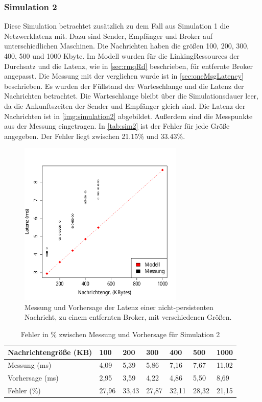 \subsubsection{Simulation 2} 
Diese Simulation betrachtet zusätzlich zu dem Fall aus Simulation 1 die Netzwerklatenz mit. Dazu sind Sender, Empfänger und Broker auf unterschiedlichen Maschinen. Die Nachrichten haben die größen 100, 200, 300, 400, 500 und 1000 Kbyte. Im Modell wurden für die LinkingRessources der Durchsatz und die Latenz, wie in \autoref{sec:rmqRd} beschrieben, für entfernte Broker angepasst. Die Messung mit der verglichen wurde ist in \autoref{sec:oneMsgLatency} beschrieben. Es wurden der Füllstand der Warteschlange und die Latenz der Nachrichten betrachtet. 
Die Warteschlange bleibt über die Simulationsdauer leer, da die Ankunftszeiten der Sender und Empfänger gleich sind. Die Latenz der Nachrichten ist in \autoref{img:simulation2} abgebildet. Außerdem sind die Messpunkte aus der Messung eingetragen. In \autoref{tab:sim2} ist der Fehler für jede Größe angegeben. Der Fehler liegt zwischen 21.15\% und 33.43\%.
\begin{figure}
\center
  \includegraphics[width=0.7\textwidth]{images/modelSimulationResults/simulation2.pdf}
  \caption{Messung und Vorhersage der Latenz einer nicht-persistenten Nachricht, zu einem entfernten Broker, mit verschiedenen Größen.}
  \label{img:simulation2}
\end{figure}

\begin{table}
\centering
  \begin{tabular}{| l | l | l | l |l | l | l |}
    \hline
    Nachrichtengröße (KB) & 100 & 200 & 300 & 400 & 500 & 1000 \\ \hline
    Messung (ms) & 4,09 & 5,39 & 5,86 & 7,16 & 7,67 & 11,02\\ \hline
    Vorhersage (ms) & 2,95 & 3,59 & 4,22 & 4,86 & 5,50 & 8,69\\ \hline
    Fehler (\%) & 27,96 & 33,43 & 27,87 & 32,11 & 28,32 & 21,15\\ \hline
    
    \hline
      \end{tabular}
	\caption{\label{tab:sim2} Fehler in \% zwischen Messung und Vorhersage für Simulation 2}
\end{table}


